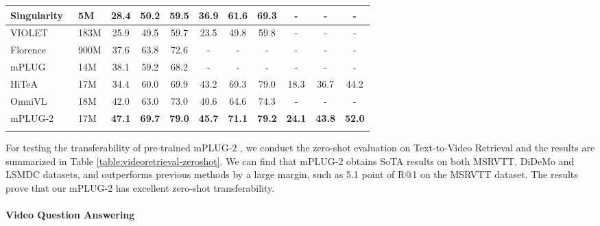 \documentclass{article}
\theoremstyle{plain}
\theoremstyle{definition}
\theoremstyle{remark}
\newlength\savewidth
\newcommand\shline{\noalign{\global\savewidth\arrayrulewidth\global\arrayrulewidth 1pt}\hline\noalign{\global\arrayrulewidth\savewidth}}
\newcommand{\modelname}{mPLUG-2 }
\begin{document}
\begin{table*}[t!]
{\begin{tabular}{ll|ccc|ccc|ccc}
        Singularity~\citep{lei2022singularity} & 5M & 28.4 & 50.2 & 59.5 & 36.9 & 61.6 & 69.3 & - & - & - \\
        \hline
        VIOLET~\citep{fu2021violet} & 183M & 25.9 & 49.5 & 59.7 & 23.5 & 49.8 & 59.8 & - & - & - \\
        Florence~\citep{yuan2021florence} & 900M & 37.6 & 63.8 & 72.6 & - & - & - & - & - & - \\
        mPLUG \citep{Li2022mPLUGEA} & 14M & 38.1 & 59.2 & 68.2 & - & - & - & - & - & - \\
        HiTeA \citep{Ye2022HiTeAHT} & 17M & 34.4 & 60.0 & 69.9 & 43.2 & 69.3 & 79.0 & 18.3 & 36.7 & 44.2 \\
        OmniVL \citep{Wang2022OmniVLOF} & 18M & 42.0 & 63.0 & 73.0 & 40.6 & 64.6 & 74.3 & - & - & - \\
        \hline
        \modelname & 17M & \textbf{47.1} & \textbf{69.7} & \textbf{79.0} & \textbf{45.7} & \textbf{71.1} & \textbf{79.2} & \textbf{24.1} & \textbf{43.8} & \textbf{52.0} \\
        \shline
\end{tabular}
    }
    \vspace{-1ex}
    \label{table:videoretrieval-zeroshot}
    \vspace{-2ex}
\end{table*} For testing the transferability of pre-trained \modelname, we conduct the zero-shot evaluation on Text-to-Video Retrieval and the results are summarized in Table \ref{table:videoretrieval-zeroshot}. We can find that \modelname obtains SoTA results on both MSRVTT, DiDeMo and LSMDC datasets, and outperforms previous methods by a large margin, such as 5.1 point of R@1 on the MSRVTT dataset. The results prove that our \modelname has excellent zero-shot transferability.

\paragraph{Video Question Answering}
\end{document}

